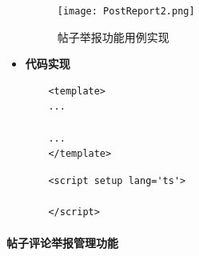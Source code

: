 \begin{itemize}
	\begin{figure}[H]
		\centering
		\texttt{[image: PostReport2.png]}
		\caption{帖子举报功能用例实现}
		\label{fig:post-report.png}
	\end{figure}

	\item \textbf{代码实现}
	\begin{verbatim}
	<template>
	...
	
	...
	</template>
	\end{verbatim}
	
	\begin{verbatim}
	<script setup lang='ts'>
	
	</script>
	\end{verbatim}
\end{itemize}

\paragraph{帖子评论举报管理功能}

